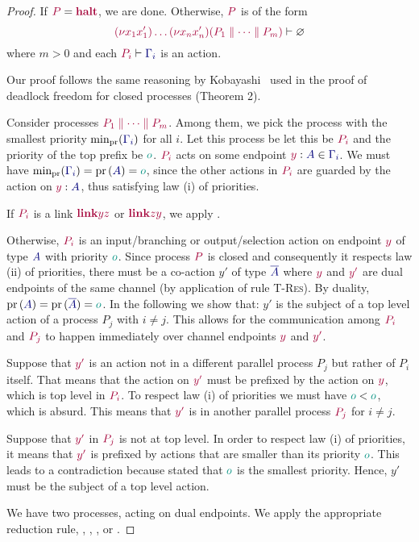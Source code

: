 \begin{proof}
  \label{prf:thm-pcp-closed-progress}
  If $\tm{P}=\tm{\halt}$, we are done. Otherwise, $\tm{P}$ is of the form
  \[
    \seq{\res{x_1}{x'_1}{\dots\res{x_n}{x'_n}{(P_1 \parallel\dots\parallel P_m)}}}{\emptyenv}
  \]
  where $m>0$ and each $\seq{P_i}{\ty{\Gamma_i}}$ is an action.

  Our proof follows the same reasoning by Kobayashi~\cite{kobayashi06} used in the proof of deadlock freedom for closed processes (Theorem 2). 

  Consider processes $\tm {P_1 \parallel\dots\parallel P_m}$. Among them, we pick the process with the smallest priority $\minpr{(\ty{\Gamma_i})}$ for all $i$. Let this process be let this be $\tm{P_i}$ and the priority of the top prefix be $\cs o$. $\tm{P_i}$ acts on some endpoint $\tmty{y}{A}\in\ty{\Gamma_i}$. We must have $\minpr{(\ty{\Gamma_i})}=\pr{(\ty{A})} = \cs o$, since the other actions in $\tm{P_i}$ are guarded by the action on $\tmty{y}{A}$, thus satisfying law (i) of priorities.

  If $\tm{P_i}$ is a link $\tm{\link{y}{z}}$ or $\tm{\link{z}{y}}$, we apply .

  Otherwise, $\tm{P_i}$ is an input/branching or output/selection action on endpoint $\tm y$ of type $\ty A$ with priority $\cs o$. Since process $\tm P$ is closed and consequently it respects law (ii) of priorities, there must be a co-action $y'$ of type $\ty{\co{A}}$  where $\tm{y}$ and $\tm{y'}$ are dual endpoints of the same channel (by application of rule \textsc{T-Res}). By duality, $\pr{(\ty{A})}=\pr{(\ty{\co{A}})}= \cs o$. In the following we show that: $y'$ is the subject of a top level action of a process $P_j$ with $i\neq j$. This allows for the communication among $\tm{P_i}$ and $\tm{P_j}$ to happen immediately over channel endpoints $\tm{y}$ and $\tm{y'}$.
  
  Suppose that $\tm{y'}$ is an action not in a different parallel process $P_j$ but rather of $P_i$ itself. That means that the action on $\tm{y'}$ must be prefixed by the action on $\tm{y}$, which is top level in $\tm{P_i}$. To respect law (i) of priorities we must have $\cs o < \cs o$, which is absurd. This means that $\tm{y'}$ is in another parallel process $\tm{P_j}$ for $i\neq j$.

  Suppose that $\tm{y'}$ in $\tm{P_j}$ is not at top level. In order to respect law (i) of priorities, it means that $\tm{y'}$ is prefixed by actions that are smaller than its priority $\cs o$. This leads to a contradiction because stated that $\cs o$ is the smallest priority. Hence, $y'$ must be the subject of a top level action.
  
  We have two processes, acting on dual endpoints. We apply the appropriate reduction rule, \ie {}, , , or .
\end{proof}

